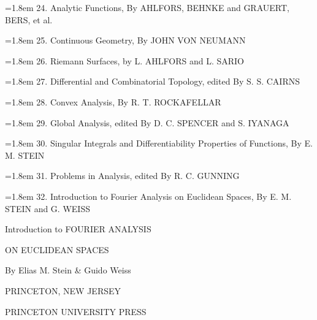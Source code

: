 {\noindent\hangindent=1.8em
24. Analytic Functions, By AHLFORS, BEHNKE and GRAUERT, BERS, et al.

\noindent\hangindent=1.8em
25. Continuous Geometry, By JOHN VON NEUMANN

\noindent\hangindent=1.8em
26. Riemann Surfaces, by L. AHLFORS and L. SARIO

\noindent\hangindent=1.8em
27. Differential and Combinatorial Topology, edited By S. S. CAIRNS

\noindent\hangindent=1.8em
28. Convex Analysis, By R. T. ROCKAFELLAR

\noindent\hangindent=1.8em
29. Global Analysis, edited By D. C. SPENCER and S. IYANAGA

\noindent\hangindent=1.8em
30. Singular Integrals and Differentiability Properties of Functions, By E. M. STEIN

\noindent\hangindent=1.8em
31. Problems in Analysis, edited By R. C. GUNNING

\noindent\hangindent=1.8em
32. Introduction to Fourier Analysis on Euclidean Spaces, By E. M. STEIN and G. WEISS
\par}

\cleardoublepage

\thispagestyle{empty}
\vspace*{2cm}
\begin{center}
\Large Introduction to {\Large FOURIER ANALYSIS}

\Large ON EUCLIDEAN SPACES
\end{center}
\vspace{4ex}
\begin{center}
\large By Elias M. Stein \& Guido Weiss
\end{center}
\vspace*{\fill}
\begin{center}
PRINCETON, NEW JERSEY

PRINCETON UNIVERSITY PRESS
\end{center}
\vspace{2ex}
\cleardoublepage

